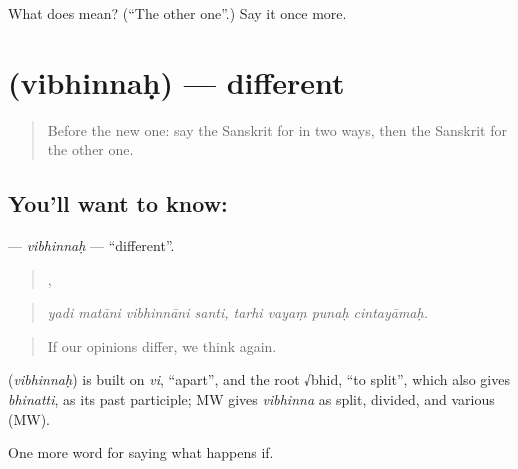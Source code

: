 \begin{tcolorbox}[breakable,colback=teal!4,colframe=teal!35!black,title={Before you move on}]
What does  mean? (\textquotedblleft{}The other one\textquotedblright{}.) Say it once more.
\end{tcolorbox}
\section[\texorpdfstring{\sk{विभिन्नः} (vibhinnaḥ)}{विभिन्नः (vibhinnaḥ)}]{ (vibhinnaḥ) — different}

\label{lesson:SA-C541-vibhinnah}



\begin{quote}
Before the new one: say the Sanskrit for in two ways, then the Sanskrit for the other one.
\end{quote}

\subsection*{You'll want to know: }
\textbf{} — \emph{vibhinnaḥ} — \textquotedblleft{}different\textquotedblright{}.

\begin{quote}
   ,    
\end{quote}

\begin{quote}
\emph{yadi matāni vibhinnāni santi, tarhi vayaṃ punaḥ cintayāmaḥ.}
\end{quote}

\begin{quote}
If our opinions differ, we think again.
\end{quote}

\begin{cousinweb}
\textbf{} (\emph{vibhinnaḥ}) is built on \emph{vi}, \textquotedblleft{}apart\textquotedblright{}, and the root √bhid, \textquotedblleft{}to split\textquotedblright{}, which also gives \emph{bhinatti}, as its past participle; MW gives \emph{vibhinna} as split, divided, and various (MW).
\end{cousinweb}

\begin{grammarlens}[title={What you've built}]
One more word for saying what happens if.
\end{grammarlens}

